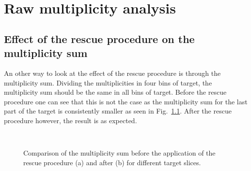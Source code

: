 
\chapter{Raw multiplicity analysis}\label{app:mult}


\section{Effect of the rescue procedure on the multiplicity sum}

An other way to look at the effect of the rescue procedure is through the multiplicity sum. Dividing the multiplicities in four bins of target, the multiplicity sum should be the same in all bins of target. Before the rescue procedure one can see that this is not the case as the multiplicity sum for the last part of the target is consistently smaller as seen in Fig.~\ref{pic:ZApp}. After the rescue procedure however, the result is as expected.

\begin{figure}[!h]
  \centering
	 \\
	\caption{Comparison of the multiplicity sum before the application of the rescue procedure (a) and after (b) for different target slices.}
	\label{pic:ZApp}
\end{figure}

